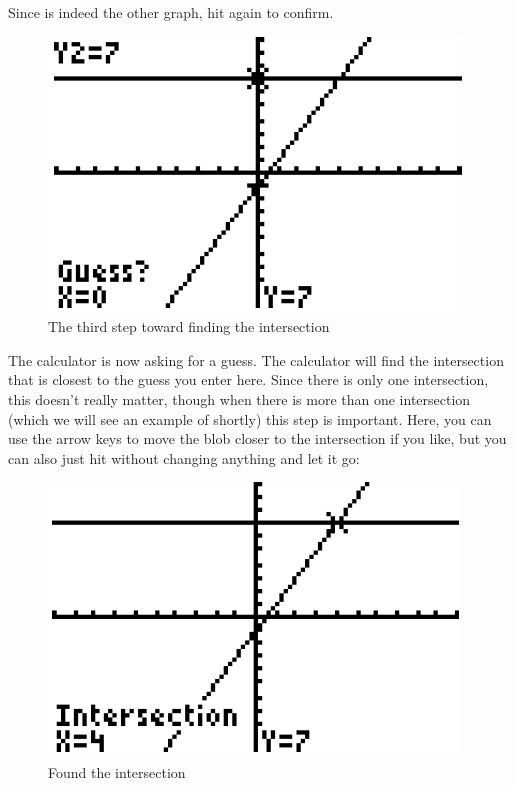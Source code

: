 Since  is indeed the other graph, hit  again to confirm.

\begin{figure}[H]
	\centering
	\includegraphics[scale=1.0]{Sections/SolvingEquationsGraphically/Figure08.png}
	\caption{The third step toward finding the intersection}
\end{figure}

The calculator is now asking for a guess. The calculator will find the intersection that is closest to the guess you enter here. Since there is only one intersection, this doesn’t really matter, though when there is more than one intersection (which we will see an example of shortly) this step is important. Here, you can use the arrow keys to move the blob closer to the intersection if you like, but you can also just hit  without changing anything and let it go:

\begin{figure}[H]
	\centering
	\includegraphics[scale=1.0]{Sections/SolvingEquationsGraphically/Figure09.png}
	\caption{Found the intersection}
\end{figure}

